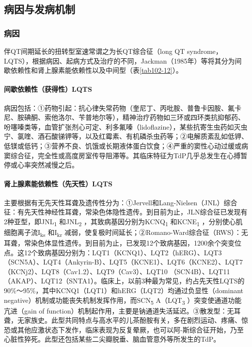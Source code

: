 \subsection{病因与发病机制}

\subsubsection{病因}

伴QT间期延长的扭转型室速常谓之为长QT综合征（long QT
syndrome，LQTS），根据病因、起病方式及治疗的不同，Jackman（1985年）等将其分为间歇依赖性和肾上腺素能依赖性以及中间型（表\ref{tab102-12}）。

\paragraph{间歇依赖性（获得性）LQTS}

病因包括：①药物引起：抗心律失常药物（奎尼丁、丙吡胺、普鲁卡因胺、氟卡尼、胺碘酮、索他洛尔、苄普地尔等），精神治疗药物如三环或四环类抗抑郁药、吩噻嗪类等，血管扩张剂心可定、利多氟嗪（lidoflazine），某些抗寄生虫药如灭虫宁、氯喹、酒石酸锑钾等，以及红霉素、有机磷杀虫药等；②电解质紊乱如低钾、低镁或低钙；③营养不良、饥饿或长期液体蛋白饮食；④严重的窦性心动过缓或病窦综合征，完全性或高度房室传导阻滞等。其临床特征为TdP几乎总发生在心搏暂停或心率突然减慢之后。

\paragraph{肾上腺素能依赖性（先天性）LQTS}

主要根据有无先天性耳聋及遗传性分为：①Jervell和Lang-Nielsen（JNL）综合征：有先天性神经性耳聋，常染色体隐性遗传。到目前为止，JLN综合征已发现有2种亚型，即JNL\textsubscript{1}
和JNL\textsubscript{2} ，其致病基因分别为KCNQ\textsubscript{1}
和KCNE\textsubscript{1} ，分别使心肌细胞离子流I\textsubscript{ks}
和I\textsubscript{kr}
减弱，使复极时间延长；②Romano-Ward综合征（RWS）：无耳聋，常染色体显性遗传。到目前为止，已发现12个致病基因，1200余个突变位点。这12个致病基因分别为：LQT1（KCNQ1）、LQT2（hERG）、LQT3（SCN5A）、LQT4（Ankyrin-B）、LQT5（KCNE1）、LQT6（KCNE2）、LQT7（KCNj2）、LQT8（Cav1.2）、LQT9（Cav3）、LQT10
（SCN4B）、LQT11（AKAP）、LQT12（SNTA1）。临床上，以前3种最为常见，约占先天性LQTS的90\%～95\%，其中KCNQ1（LQT1）和hERG（LQT2）均通过负显性（dominant
negative）机制或功能丧失机制发挥作用，而SCN\textsubscript{5}
A（LQT\textsubscript{3} ）突变使通道功能亢进（gain of
function）机制起作用，主要是钠通道失活延迟。③散发型：无耳聋，无家族史。此型共同特点与高水平的儿茶酚胺有关，多在剧烈运动、疼痛、惊恐或其他应激状态下发作，临床表现为反复晕厥，也可以阿-斯综合征开始，乃至心脏性猝死。此型还包括某些二尖瓣脱垂、脑血管意外等所发生的TdP。


